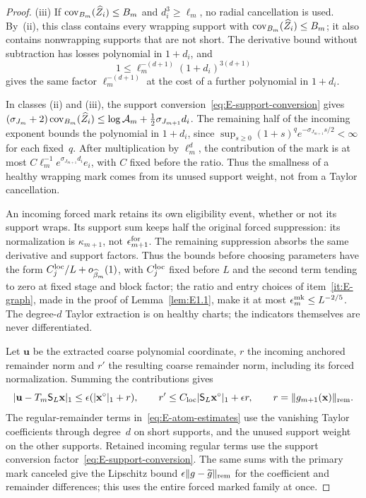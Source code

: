 \begin{proof}
(iii) If $\operatorname{cov}_{B_m}(\widehat Z_i)\le B_m$ and $d_i^3\ge\ell_m$, no radial cancellation is used. By~(ii), this class contains every wrapping support with $\operatorname{cov}_{B_m}(\widehat Z_i)\le B_m$; it also contains nonwrapping supports that are not short. The derivative bound without subtraction has losses polynomial in $1+d_i$, and
\begin{equation*}
 1\le\ell_m^{-(d+1)}(1+d_i)^{3(d+1)}
\end{equation*}
gives the same factor $\ell_m^{-(d+1)}$ at the cost of a further polynomial in $1+d_i$.

In classes (ii) and (iii), the support conversion~\eqref{eq:E-support-conversion} gives $(\sigma_{J_m}+2)\operatorname{cov}_{B_m}(\widehat Z_i)\le\log\mathcal A_m+\tfrac12\sigma_{J_{m+1}}d_i$. The remaining half of the incoming exponent bounds the polynomial in $1+d_i$, since $\sup_{s\ge0}(1+s)^qe^{-\sigma_{J_{m+1}}s/2}<\infty$ for each fixed~$q$. After multiplication by $\ell_m^d$, the contribution of the mark is at most $C\ell_m^{-1}e^{\sigma_{J_{m+1}}d_i}e_i$, with $C$ fixed before the ratio. Thus the smallness of a healthy wrapping mark comes from its unused support weight, not from a Taylor cancellation.

An incoming forced mark retains its own eligibility event, whether or not its support wraps. Its support sum keeps half the original forced suppression: its normalization is $\kappa_{m+1}$, not $\epsilon_{m+1}^{\rm for}$. The remaining suppression absorbs the same derivative and support factors. Thus the bounds before choosing parameters have the form $C_j^{\rm loc}/L+o_{\widehat\beta_m}(1)$, with $C_j^{\rm loc}$ fixed before $L$ and the second term tending to zero at fixed stage and block factor; the ratio and entry choices of item~\ref{it:E-graph}, made in the proof of Lemma~\ref{lem:E1.1}, make it at most $\epsilon^{\rm mk}_m\le L^{-2/5}$. The degree-$d$ Taylor extraction is on healthy charts; the indicators themselves are never differentiated.

Let $\mathbf u$ be the extracted coarse polynomial coordinate, $r$ the incoming anchored remainder norm and $r'$ the resulting coarse remainder norm, including its forced normalization. Summing the contributions gives
\begin{equation}\label{eq:E-atom-estimates}
 |\mathbf u-T_m\mathsf S_L\mathbf x|_1\le\epsilon(|\mathbf x^\circ|_1+r),\qquad
 r'\le C_{\rm loc}|\mathsf S_L\mathbf x^\circ|_1+\epsilon r,
 \qquad r=\|g_{m+1}(\mathbf x)\|_{\rm rem}.
\end{equation}
The regular-remainder terms in~\eqref{eq:E-atom-estimates} use the vanishing Taylor coefficients through degree~$d$ on short supports, and the unused support weight on the other supports. Retained incoming regular terms use the support conversion factor~\eqref{eq:E-support-conversion}. The same sums with the primary mark canceled give the Lipschitz bound $\epsilon\|g-\widetilde g\|_{\rm rem}$ for the coefficient and remainder differences; this uses the entire forced marked family at once.


\end{proof}

